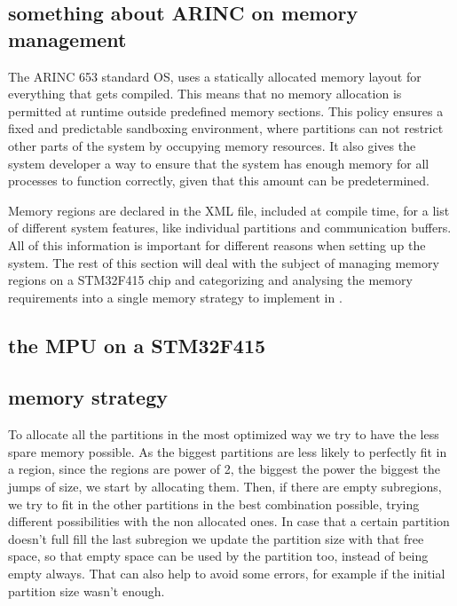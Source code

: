 \subsection{something about ARINC on memory management}
The ARINC 653 standard OS, uses a statically allocated memory layout for everything
that gets compiled.
This means that no memory allocation is permitted at runtime
outside predefined memory sections.
This policy ensures a fixed and predictable sandboxing environment, where partitions
can not restrict other parts of the system by occupying memory resources.
It also gives the system developer a way to ensure that the system has enough memory
for all processes to function correctly, given that this amount can be predetermined.

Memory regions are declared in the XML file, included at compile time, for a list
of different system features, like individual partitions and communication buffers.
All of this information is important for different reasons when setting up the system.
The rest of this section will deal with the subject of managing memory regions on a STM32F415 chip
and categorizing and analysing the memory requirements into a single memory strategy to implement in
.

\subsection{the MPU on a STM32F415}



\subsection{memory strategy}
To allocate all the partitions in the most optimized way we try to have the less spare memory possible. As
 the biggest partitions are less likely to perfectly fit in a region, since the regions are power of 2,
  the biggest the power the biggest the jumps of size, we start by allocating them. Then, if there are
   empty subregions, we try to fit in the other partitions in the best combination possible, trying
    different possibilities with the non allocated ones. In case that a certain partition doesn't full
    fill the last subregion we update the partition size with that free space, so that empty space can be
    used by the partition too, instead of being empty always. That can also help to avoid some errors, 
    for example if the initial partition size wasn't enough.



